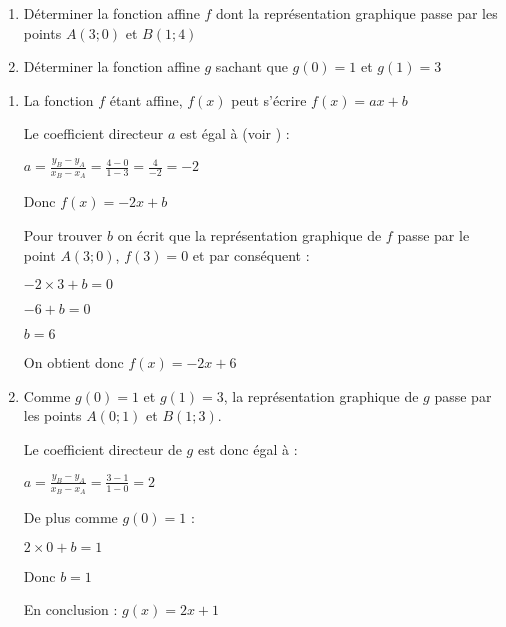 
%
\begin{enumerate}
     \item
     Déterminer la fonction affine $f$ dont la représentation graphique passe par les points $A\left(3 ; 0\right)$ et $B\left(1 ; 4\right)$
     \item
     Déterminer la fonction affine $g$ sachant que $g\left(0\right)=1$ et $g\left(1\right)=3$
\end{enumerate}
\begin{corrige}
     \begin{enumerate}
          \item
          La fonction $f$ étant affine, $f\left(x\right)$ peut s'écrire $f\left(x\right)=ax+b$
          \par
          Le coefficient directeur $a$ est égal à (voir ) :
          \par
          $a = \frac{y_{B}-y_{A}}{x_{B}-x_{A}}=\frac{4-0}{1-3}=\frac{4}{-2}=-2$
          \par
          Donc $f\left(x\right)=-2x+b$
          \par
          Pour trouver $b$ on écrit que la représentation graphique de $f$ passe par le point $A\left(3 ; 0\right)$, $f\left(3\right)=0$ et par conséquent :
          \par
          $-2\times 3+b=0$
          \par
          $-6+b=0$
          \par
          $b=6$
          \par
          On obtient donc $f\left(x\right)=-2x+6$
          \item
          Comme $g\left(0\right)=1$ et $g\left(1\right)=3$, la représentation graphique de $g$ passe par les points $A\left(0 ; 1\right)$ et $B\left(1 ; 3\right)$.
          \par
          Le coefficient directeur de $g$ est donc égal à :
          \par
          $a = \frac{y_{B}-y_{A}}{x_{B}-x_{A}}=\frac{3-1}{1-0}=2$
          \par
          De plus comme $g\left(0\right)=1$ :
          \par
          $2\times 0+b=1$
          \par
          Donc $b=1$
          \par
          En conclusion : $g\left(x\right)=2x+1$
     \end{enumerate}
\end{corrige}
 
